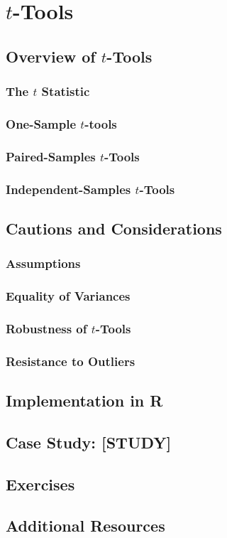 
\chapter{$t$-Tools}

\section{Overview of $t$-Tools}

\subsection{The $t$ Statistic}

\subsection{One-Sample $t$-tools}

\subsection{Paired-Samples $t$-Tools}

\subsection{Independent-Samples $t$-Tools}

\section{Cautions and Considerations}

\subsection{Assumptions}

\subsection{Equality of Variances}

\subsection{Robustness of $t$-Tools}

\subsection{Resistance to Outliers}

\section{Implementation in R}

\section{Case Study: [STUDY]}

\section{Exercises}

\section{Additional Resources}
